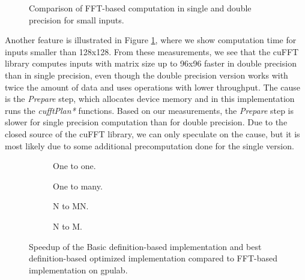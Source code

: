 \begin{figure}[ht]
	\centering
	\def\svgwidth{0.3\textwidth}
	
	\caption{Comparison of FFT-based computation in single and double precision for small inputs.}
	\label{fig:fft_double_faster_compute_time}
\end{figure}

Another feature is illustrated in Figure \ref{fig:fft_double_faster_compute_time}, where we show computation time for inputs smaller than 128x128. From these measurements, we see that the cuFFT library computes inputs with matrix size up to 96x96 faster in double precision than in single precision, even though the double precision version works with twice the amount of data and uses operations with lower throughput. The cause is the \textit{Prepare} step, which allocates device memory and in this implementation runs the \textit{cufftPlan*} functions. Based on our measurements, the \textit{Prepare} step is slower for single precision computation than for double precision. Due to the closed source of the cuFFT library, we can only speculate on the cause, but it is most likely due to some additional precomputation done for the single version. 


\begin{figure}[ht]
	\centering	
	\begin{subfigure}{0.4\textwidth}
		\centering
		\def\svgwidth{\textwidth}
		
		\caption{One to one.}
		\label{fig:fft_speedup_one_to_one}
	\end{subfigure}
	\begin{subfigure}{0.4\textwidth}
		\centering
		\def\svgwidth{\textwidth}
		
		\caption{One to many.}
		\label{fig:fft_speedup_one_to_many}
	\end{subfigure}
	\begin{subfigure}{0.4\textwidth}
		\centering
		\def\svgwidth{\textwidth}
		
		\caption{N to MN.}
		\label{fig:fft_speedup_n_to_mn}
	\end{subfigure}
	\begin{subfigure}{0.4\textwidth}
		\centering
		\def\svgwidth{\textwidth}
		
		\caption{N to M.}
		\label{fig:fft_speedup_n_to_m}
	\end{subfigure}
	\caption{Speedup of the Basic definition-based implementation and best definition-based optimized implementation compared to FFT-based implementation on gpulab.}
	\label{fig:fft_speedup}
\end{figure}

